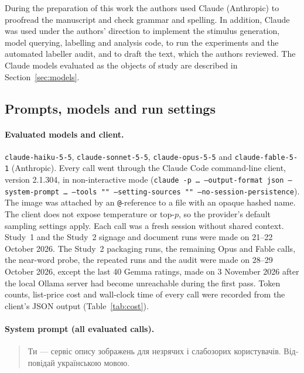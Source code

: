 \documentclass[pdflatex,sn-mathphys-num]{sn-jnl}%
\theoremstyle{thmstyleone}%
\theoremstyle{thmstyletwo}%
\theoremstyle{thmstylethree}%
\begin{document}
During the preparation of this work the authors used Claude (Anthropic) to proofread the manuscript and check grammar and spelling. In addition, Claude was used under the authors' direction to implement the stimulus generation, model querying, labelling and analysis code, to run the experiments and the automated labeller audit, and to draft the text, which the authors reviewed. The Claude models evaluated as the objects of study are described in Section~\ref{sec:models}.

\begin{appendices}

\section{Prompts, models and run settings}\label{secA1}

\paragraph{Evaluated models and client.} \texttt{claude-haiku-5-5}, \texttt{claude-sonnet-5-5}, \texttt{claude-opus-5-5} and \texttt{claude-fable-5-1} (Anthropic). Every call went through the Claude Code command-line client, version 2.1.304, in non-interactive mode (\texttt{claude -p \ldots{} --output-format json --system-prompt \ldots{} --tools "" --setting-sources "" --no-session-persistence}). The image was attached by an \texttt{@}-reference to a file with an opaque hashed name. The client does not expose temperature or top-$p$, so the provider's default sampling settings apply. Each call was a fresh session without shared context. Study~1 and the Study~2 signage and document runs were made on 21--22 October 2026. The Study~2 packaging runs, the remaining Opus and Fable calls, the near-word probe, the repeated runs and the audit were made on 28--29 October 2026, except the last 40 Gemma ratings, made on 3 November 2026 after the local Ollama server had become unreachable during the first pass. Token counts, list-price cost and wall-clock time of every call were recorded from the client's JSON output (Table~\ref{tab:cost}).

\paragraph{System prompt (all evaluated calls).}
\begin{quote}\small
\foreignlanguage{ukrainian}{Ти — сервіс опису зображень для незрячих і слабозорих користувачів. Відповідай українською мовою.}
\end{quote}


\end{appendices}
\end{document}
